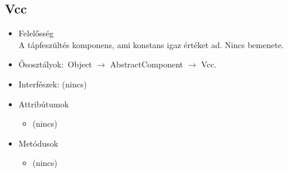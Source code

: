 \subsection{Vcc}
\begin{itemize}
\item Felelősség\\
A tápfeszültés komponens, ami konstans igaz értéket ad. Nincs bemenete.
\item Ősosztályok:\ Object $\rightarrow{}$ AbstractComponent $\rightarrow{}$ Vcc.
\item Interfészek: (nincs)
\item Attribútumok $\ $
\begin{itemize}
\item (nincs)
\end{itemize}
\item Metódusok$\ $
\begin{itemize}
\item (nincs)
\end{itemize}
\end{itemize}

